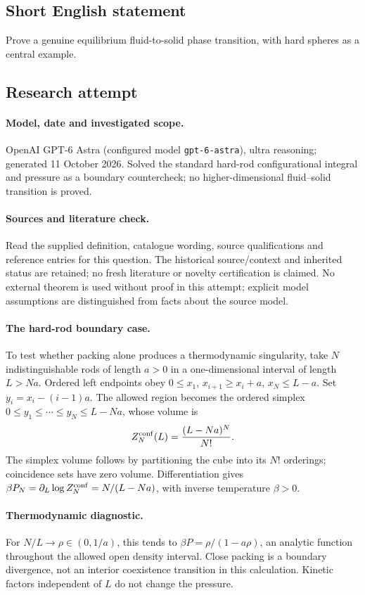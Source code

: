 \documentclass[11pt]{article}
\begin{document}
\subsection{Short English statement}
Prove a genuine equilibrium fluid-to-solid phase transition, with hard spheres as a central example.
\subsection{Research attempt}
\paragraph{Model, date and investigated scope.}
OpenAI GPT-6 Astra (configured model \texttt{gpt-6-astra}), ultra reasoning; generated 11 October 2026. Solved the standard hard-rod configurational integral and pressure as a boundary countercheck; no higher-dimensional fluid–solid transition is proved.

\paragraph{Sources and literature check.}
Read the supplied definition, catalogue wording, source qualifications and reference entries for this question. The historical source/context and inherited status are retained; no fresh literature or novelty certification is claimed. No external theorem is used without proof in this attempt; explicit model assumptions are distinguished from facts about the source model.

\paragraph{The hard-rod boundary case.} To test whether packing alone produces a thermodynamic singularity, take \(N\) indistinguishable rods of length \(a>0\) in a one-dimensional interval of length \(L>Na\). Ordered left endpoints obey \(0\le x_1\), \(x_{i+1}\ge x_i+a\), \(x_N\le L-a\). Set \(y_i=x_i-(i-1)a\). The allowed region becomes the ordered simplex \(0\le y_1\le\cdots\le y_N\le L-Na\), whose volume is
\[
 Z_N^{\rm conf}(L)=\frac{(L-Na)^N}{N!}.
\]
The simplex volume follows by partitioning the cube into its \(N!\) orderings; coincidence sets have zero volume. Differentiation gives \(\beta P_N=\partial_L\log Z_N^{\rm conf}=N/(L-Na)\), with inverse temperature \(\beta>0\).
\paragraph{Thermodynamic diagnostic.} For \(N/L\to\rho\in(0,1/a)\), this tends to \(\beta P=\rho/(1-a\rho)\), an analytic function throughout the allowed open density interval. Close packing is a boundary divergence, not an interior coexistence transition in this calculation. Kinetic factors independent of \(L\) do not change the pressure.
\end{document}
